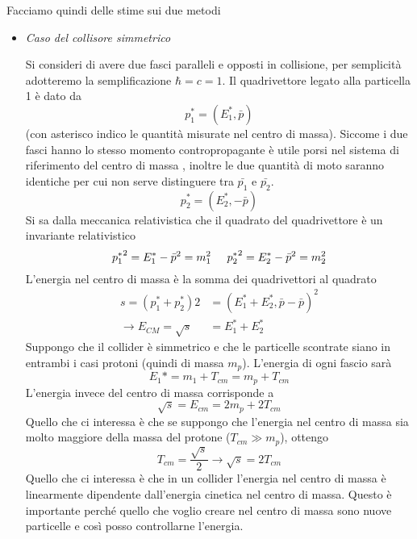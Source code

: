 Facciamo quindi delle stime sui due metodi
\begin{itemize}
\item \emph{Caso del collisore simmetrico}

Si consideri di avere due fasci paralleli e opposti in collisione, per semplicità adotteremo la semplificazione $\hbar=c=1$.
Il quadrivettore legato alla particella 1 è dato da
\begin{equation}
p_1^*=(E_1^*,\bar{p})
\end{equation}
(con asterisco indico le quantità misurate nel centro di massa).
Siccome i due fasci hanno lo stesso momento contropropagante è utile porsi nel sistema di riferimento del centro di massa , inoltre le due quantità di moto saranno identiche per cui non serve distinguere tra $\bar{p_1}$ e $\bar{p_2}$.
\begin{equation}
p_2^*=(E_2^*,-\bar{p})
\end{equation}
Si sa dalla meccanica relativistica che il quadrato del quadrivettore è un invariante relativistico
\begin{equation}
{p_1^*}^2=E_1^*-\bar{p}^2=m_1^2\hspace{0.5cm}{p_2^*}^2=E_2^*-\bar{p}^2=m_2^2
\end{equation}
L'energia nel centro di massa è la somma dei quadrivettori al quadrato
\begin{equation}
\begin{split}
s=(p_1^*+p_2^*)2&=(E_1^*+E_2^*, \bar{p}-\bar{p})^2\\
\to E_{CM}=\sqrt{s}&=E_1^*+E_2^*
\end{split}
\end{equation}
Suppongo che il collider è simmetrico e che le particelle scontrate siano in entrambi i casi protoni (quindi di massa $m_p$).
L'energia di ogni fascio sarà
\begin{equation}
E_1*=m_1+T_{cm}=m_p+T_{cm}
\end{equation}
L'energia invece del centro di massa corrisponde a 
\begin{equation}
\sqrt{s}=E_{cm}=2m_p+2T_{cm}
\end{equation}
Quello che ci interessa è che se suppongo che l'energia nel centro di massa sia molto maggiore della massa del protone ($T_{cm}\gg m_p$), ottengo
\begin{equation}
T_{cm}=\frac{\sqrt{s}}{2}\to \sqrt{s}=2T_{cm}
\end{equation}
Quello che ci interessa è che in un collider l'energia nel centro di massa è linearmente dipendente dall'energia cinetica nel centro di massa.
Questo è importante perché quello che voglio creare nel centro di massa sono nuove particelle e così posso controllarne l'energia.


\end{itemize}
